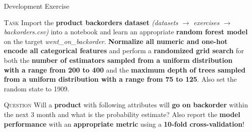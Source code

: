 \documentclass[document.tex]{subfiles}
\begin{document}
    \begin{frame}{Development Exercise }
        \begin{alertblock}{\textsc{Task}}
            Import the \textbf{product backorders dataset} \textit{(datasets $\rightarrow$ exercises $\rightarrow$ backorders.csv)} into a notebook and learn an appropriate \textbf{random forest model} on the target \textit{went\_on\_backorder}. \textbf{Normalize all numeric and one-hot encode all categorical features} and perform a \textbf{randomized grid search} for both the \textbf{number of estimators sampled from a uniform distribution with a range from 200 to 400} and the \textbf{maximum depth of trees sampled from a uniform distribution with a range from 75 to 125}. Also set the random state to 1909.
        \end{alertblock}
        \begin{alertblock}{\textsc{Question}}
            Will a \textbf{product} with following attributes will \textbf{go on backorder} within the next 3 month and what is the probability estimate? Also report the \textbf{model performance} with an \textbf{appropriate metric} using a \textbf{10-fold cross-validation}!
            \begin{table}
                \scalebox{.8}{}

                \scalebox{.8}{}
            \end{table}
        \end{alertblock}
    \end{frame}
       
\end{document}
